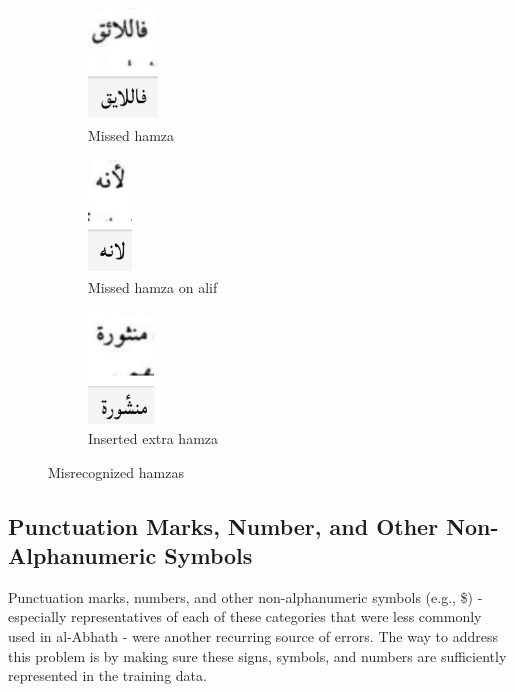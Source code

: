 \begin{figure}[h]
	\centering
	\begin{subfigure}[t]{0.3\linewidth}
	\centering
	\includegraphics[height=3cm]{images/image28.png}
	\caption{Missed hamza}
	\label{fig3:fig18}
	\end{subfigure}
	\begin{subfigure}[t]{0.3\linewidth}
	\centering
	\includegraphics[height=3cm]{images/image29.png}
	\caption{Missed hamza on alif}
	\label{fig3:fig19}
	\end{subfigure}
	\begin{subfigure}[t]{0.3\linewidth}
	\centering
	\includegraphics[height=3cm]{images/image30.png}
	\caption{Inserted extra hamza}
	\label{fig3:fig20}
	\end{subfigure}
	\caption{Misrecognized hamzas}
	\label{fig3:fig1820}
\end{figure}

\subsection{Punctuation Marks, Number, and Other Non-Alphanumeric Symbols}

Punctuation marks, numbers, and other non-alphanumeric symbols (e.g.,
\$) - especially representatives of each of these categories that were less
commonly used in al-Abhath - were another recurring source of errors. The way to
address this problem is by making sure these signs, symbols, and numbers are
sufficiently represented in the training data.

